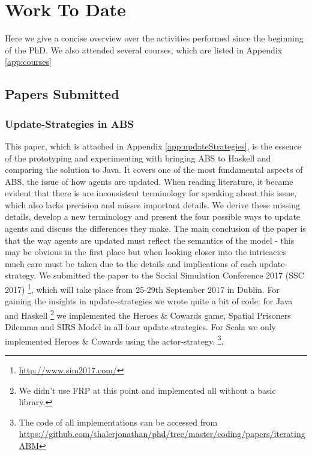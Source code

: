 \chapter{Work To Date}
\label{chap:work}


Here we give a concise overview over the activities performed since the beginning of the PhD. We also attended several courses, which are listed in Appendix \ref{app:courses}

\section{Papers Submitted}
\subsection{Update-Strategies in ABS}
This paper, which is attached in Appendix \ref{app:updateStrategies}, is the essence of the prototyping and experimenting with bringing ABS to Haskell and comparing the solution to Java. It covers one of the most fundamental aspects of ABS, the issue of how agents are updated. When reading literature, it became evident that there is are inconsistent terminology for speaking about this issue, which also lacks precision and misses important details. We derive these missing details, develop a new terminology and present the four possible ways to update agents and discuss the differences they make. The main conclusion of the paper is that the way agents are updated must reflect the semantics of the model - this may be obvious in the first place but when looking closer into the intricacies  much care must be taken due to the details and implications of each update-strategy.
We submitted the paper to the Social Simulation Conference 2017 (SSC 2017) \footnote{\url{http://www.sim2017.com/}}, which will take place from 25-29th September 2017 in Dublin.
For gaining the insights in update-strategies we wrote quite a bit of code: for Java and Haskell \footnote{We didn't use FRP at this point and implemented all without a basic library.} we implemented the Heroes \& Cowards game, Spatial Prisoners Dilemma and SIRS Model in all four update-strategies. For Scala we only implemented Heroes \& Cowards using the actor-strategy.
\footnote{The code of all implementations can be accessed from \url{https://github.com/thalerjonathan/phd/tree/master/coding/papers/iteratingABM}}. 

